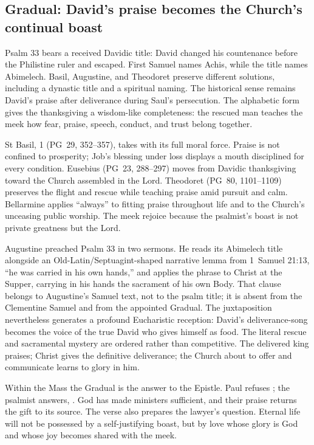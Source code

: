 \elementguard
\subsection*{Gradual: David's praise becomes the Church's continual boast }

Psalm 33 bears a received Davidic title: David changed his countenance before
the Philistine ruler and escaped. First Samuel names Achis, while the title
names Abimelech. Basil, Augustine, and Theodoret preserve different solutions,
including a dynastic title and a spiritual naming. The historical sense
remains David's praise after deliverance during Saul's persecution. The
alphabetic form gives the thanksgiving a wisdom-like completeness: the rescued
man teaches the meek how fear, praise, speech, conduct, and trust belong
together.

St Basil,  1 (PG~29, 352--357), takes
 with its full moral force. Praise is not confined to
prosperity; Job's blessing under loss displays a mouth disciplined for every
condition. Eusebius (PG~23, 288--297) moves from Davidic thanksgiving toward
the Church assembled in the Lord. Theodoret (PG~80, 1101--1109) preserves the
flight and rescue while teaching praise amid pursuit and calm. Bellarmine
applies ``always'' to fitting praise throughout life and to the Church's
unceasing public worship. The meek rejoice because the psalmist's boast is not
private greatness but the Lord.

Augustine preached Psalm 33 in two sermons. He reads its Abimelech title
alongside an Old-Latin/Septuagint-shaped narrative lemma from 1~Samuel 21:13,
``he was carried in his own hands,'' and applies the phrase to Christ at the
Supper, carrying in his hands the sacrament of his own Body. That clause
belongs to Augustine's Samuel text, not to the psalm title; it is absent from
the Clementine Samuel and from the appointed Gradual. The juxtaposition
nevertheless generates a profound Eucharistic reception:
David's deliverance-song becomes the voice of the true David who gives himself
as food. The literal rescue and sacramental mystery are ordered rather than
competitive. The delivered king praises; Christ gives the definitive
deliverance; the Church about to offer and communicate learns to glory in him.

Within the Mass the Gradual is the answer to the Epistle. Paul refuses
; the psalmist answers, . God has made ministers sufficient, and their praise returns the
gift to its source. The verse also prepares the lawyer's question. Eternal life
will not be possessed by a self-justifying boast, but by love whose glory is
God and whose joy becomes shared with the meek.

